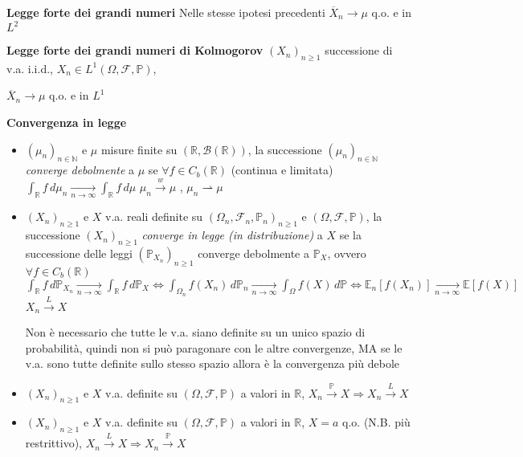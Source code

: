 \documentclass[openany]{book} %
\begin{document}
\textbf{Legge forte dei grandi numeri} Nelle stesse ipotesi precedenti $\overline {X}_n \rightarrow\mu$ q.o. e in $L^2$

\textbf{Legge forte dei grandi numeri di Kolmogorov} $(X_n)_{n\geq 1}$ successione di v.a. i.i.d., $X_n\in L^1(\Omega,\mathcal{F},\mathbb{P})$,

$\overline {X}_n \rightarrow\mu$ q.o. e in $L^1$

\textbf{Convergenza in legge}

\begin{itemize}

	\item $(\mu_n)_{n\in \mathbb{N}}$ e $\mu$ misure finite su $(\mathbb{R},\mathcal{B}(\mathbb{R}))$, la successione $(\mu_n)_{n\in \mathbb{N}}$ \textit{converge debolmente} a $\mu$ se $\forall f \in C_b(\mathbb{R})$ (continua e limitata) $\int_{\mathbb{R}} f\,d\mu_n\underset {n \rightarrow\infty}\rightarrow\int_{\mathbb{R}}f\,d\mu$ \quad $\mu_n\overset w \rightarrow \mu$ , $\mu_n\rightharpoonup\mu$

	\item $(X_n)_{n\geq 1}$ e $X$ v.a. reali definite su $(\Omega_n,\mathcal{F}_n,\mathbb{P}_n)_{n\geq 1}$ e $(\Omega,\mathcal{F},\mathbb{P})$, la successione $(X_n)_{n\geq 1}$ \textit{converge in legge (in distribuzione)} a $X$ se la successione delle leggi $(\mathbb{P}_{X_n})_{n\geq 1}$ converge debolmente a $\mathbb{P}_X$, ovvero $\forall f \in C_b(\mathbb{R})$ $\int_{\mathbb{R}}f\,d \mathbb{P}_{X_n}\underset{n \rightarrow\infty}{\rightarrow}\int_{\mathbb{R}}f\,d \mathbb{P}_X \Leftrightarrow \int_{\Omega_n}f(X_n)\,d \mathbb{P}_n\underset{n \rightarrow\infty}{\rightarrow}\int_{\Omega}f(X)\,d \mathbb{P} \Leftrightarrow \mathbb{E}_n[f(X_n)]\underset{n \rightarrow\infty}{\rightarrow}\mathbb{E}[f(X)]$ \quad $X_n \overset{L}{\rightarrow}X$

	      Non è necessario che tutte le v.a. siano definite su un unico spazio di probabilità, quindi non si può paragonare con le altre convergenze, MA se le v.a. sono tutte definite sullo stesso spazio allora è la convergenza più debole

	\item $(X_n)_{n\geq 1}$ e $X$ v.a. definite su $(\Omega,\mathcal{F},\mathbb{P})$ a valori in $\mathbb{R}$, $X_n \overset{\mathbb{P}}{\rightarrow}X\Rightarrow X_n \overset{L}{\rightarrow}X$

	\item $(X_n)_{n\geq 1}$ e $X$ v.a. definite su $(\Omega,\mathcal{F},\mathbb{P})$ a valori in $\mathbb{R}$, $X=a$ q.o. (N.B. più restrittivo), $X_n \overset{L}{\rightarrow}X\Rightarrow X_n \overset{\mathbb{P}}{\rightarrow}X$

\end{itemize}
\end{document}
